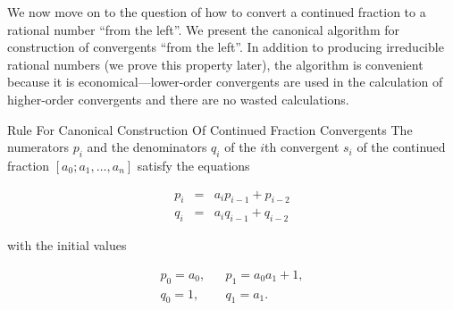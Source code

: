 We now move on to the question of how to convert a continued fraction
to a rational number ``from the left''.  We present the
canonical algorithm for construction of convergents ``from the left''.  
In addition
to producing irreducible rational numbers (we prove this property
later), the algorithm is
convenient because it is economical---lower-order convergents
are used in the calculation of higher-order convergents and there
are no wasted calculations.

\begin{vworktheoremstatementpar}{Rule For Canonical Construction Of Continued Fraction
                                 Convergents}
\label{thm:ccfr0:scnv0:canonicalconvergentconstruction}
The numerators $p_i$ and the denominators $q_i$ of the $i$th
convergent $s_i$ of the continued fraction
$[a_0;a_1, \ldots{} , a_n]$ satisfy the equations

\begin{eqnarray}
\label{eq:thm:ccfr0:scnv0:canonicalconvergentconstruction:01}
p_i & = & a_i p_{i-1} + p_{i-2}  \\
\label{eq:thm:ccfr0:scnv0:canonicalconvergentconstruction:02}
q_i & = & a_i q_{i-1} + q_{i-2}
\end{eqnarray}

\noindent{}with the initial values

\begin{eqnarray}
\label{eq:thm:ccfr0:scnv0:canonicalconvergentconstruction:03}
p_0 = a_0, & & p_1 = a_0 a_1 + 1, \\
\label{eq:thm:ccfr0:scnv0:canonicalconvergentconstruction:04}
q_0 = 1, & &   q_1 = a_1 .
\end{eqnarray}
\end{vworktheoremstatementpar}
